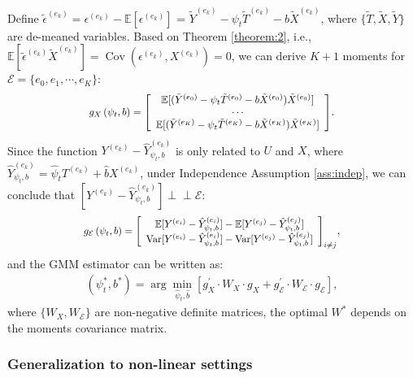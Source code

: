 \documentclass[journal]{IEEEtran}
\newcommand*{\Scale}[2][4]{\scalebox{#1}{$#2$}}
\newcommand{\indep}{\perp \!\!\! \perp}
\begin{document}
Define $\tilde{\epsilon}^{(e_k)} = \epsilon^{(e_k)}-\mathbb{E}[\epsilon^{(e_k)}] $ = $\tilde{Y}^{(e_k)} - \psi_t \tilde{T}^{(e_k)} - b \tilde{X}^{(e_k)} $, where $\{\tilde{T},\tilde{X},\tilde{Y}\}$ are de-meaned variables. Based on Theorem \ref{theorem:2}, i.e., $ \mathbb{E}[\tilde{\epsilon}^{(e_k)}\tilde{X}^{(e_k)}] = \operatorname{Cov}(\epsilon^{(e_k)} , X^{(e_k)} ) = 0$, we can derive $K+1$ moments for $\mathcal{E}=\{e_0,e_1,\cdots,e_K\}$:
\begin{eqnarray}
\Scale[0.9]{
g_X\left(\psi_t, b\right)=\left[\begin{array}{c}
\mathbb{E}[(\tilde{Y}^{(e_0)} - \psi_t \tilde{T}^{(e_0)} - b \tilde{X}^{(e_0)})\tilde{X}^{(e_0)}] \\
\cdots \\
\mathbb{E}[(\tilde{Y}^{(e_K)} - \psi_t \tilde{T}^{(e_K)} - b \tilde{X}^{(e_K)})\tilde{X}^{(e_K)}]
\end{array}\right]
}.
\end{eqnarray}
Since the function $Y^{(e_k)} - \hat{Y}^{(e_k)}_{\psi_t,b}$ is only related to $U$ and $X$, where $\hat{Y}^{(e_k)}_{\psi_t,b} = \hat{\psi}_t T^{(e_k)}+\hat{b}X^{(e_k)}$, under Independence Assumption \ref{ass:indep}, we can conclude that $[Y^{(e_k)} - \hat{Y}^{(e_k)}_{\psi_t,b}] \indep \mathcal{E}$:
\begin{eqnarray}
\Scale[0.88]{
g_{\mathcal{E}}\left(\psi_t,b\right) = 
\left[\begin{array}{c}
\mathbb{E}[Y^{(e_i)} - \hat{Y}^{(e_i)}_{\psi_t,b}]  -
\mathbb{E}[Y^{(e_j)} - \hat{Y}^{(e_j)}_{\psi_t,b}] 
\\
\operatorname{Var}[Y^{(e_i)} - \hat{Y}^{(e_i)}_{\psi_t,b}]  -
\operatorname{Var}[Y^{(e_j)} - \hat{Y}^{(e_j)}_{\psi_t,b}]
\end{array}\right]_{i \not= j}}, 
\end{eqnarray}
and the GMM estimator can be written as:
\begin{eqnarray} \label{eq:gmm}
\left({\psi}_t^*, {b}^* \right)
= 
\arg \min_{\hat{\psi}_t, \hat{b}} 
\left[ 
g_X^\prime \cdot W_X \cdot g_X
+ 
g_{\mathcal{E}}^\prime \cdot W_{\mathcal{E}} \cdot g_{\mathcal{E}}
\right],
\end{eqnarray}
where $\{W_X,W_{\mathcal{E}}\}$ are non-negative definite matrices, the optimal $W^\ast$ depends on the moments covariance matrix.

\subsubsection{Generalization to non-linear settings}
\end{document}
